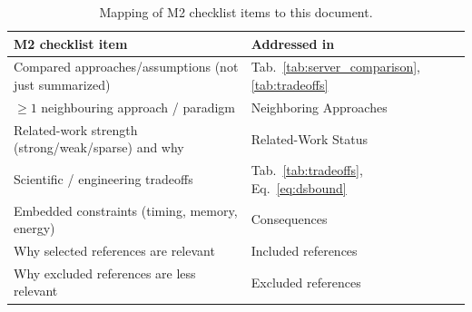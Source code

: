 \documentclass[conference]{IEEEtran}
\begin{document}
\begin{table}[t]
\caption{Mapping of M2 checklist items to this document.}
\label{tab:checklist}
\centering
\renewcommand{\arraystretch}{1.2}
\begin{tabular}{p{6.0cm} p{2.0cm}}
\toprule
\textbf{M2 checklist item} & \textbf{Addressed in} \\
\midrule
Compared approaches/assumptions (not just summarized) & Tab.~\ref{tab:server_comparison}, \ref{tab:tradeoffs} \\
$\ge 1$ neighbouring approach / paradigm & Neighboring Approaches \\
Related-work strength (strong/weak/sparse) and why & Related-Work Status \\
Scientific / engineering tradeoffs & Tab.~\ref{tab:tradeoffs}, Eq.~\eqref{eq:dsbound} \\
Embedded constraints (timing, memory, energy) & Consequences \\
Why selected references are relevant & Included references \\
Why excluded references are less relevant & Excluded references \\
\bottomrule
\end{tabular}
\end{table}
\end{document}
